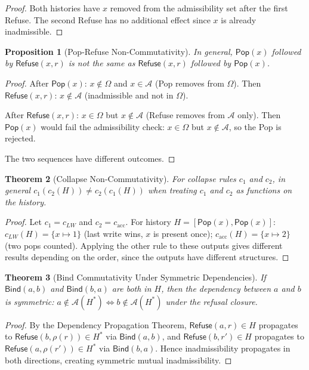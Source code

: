 \documentclass[12pt, a4paper, openany]{book}
\theoremstyle{plain}
\newtheorem{theorem}{Theorem}[chapter]
\newtheorem{proposition}[theorem]{Proposition}
\theoremstyle{definition}
\theoremstyle{remark}
\newcommand{\Pop}{\mathsf{Pop}}
\newcommand{\Refuse}{\mathsf{Refuse}}
\newcommand{\Bind}{\mathsf{Bind}}
\newcommand{\calA}{\mathcal{A}}
\begin{document}
\begin{proof}
Both histories have $x$ removed from the admissibility set after the first
Refuse. The second Refuse has no additional effect since $x$ is already
inadmissible.
\end{proof}

\begin{proposition}[Pop-Refuse Non-Commutativity]
In general, $\Pop(x)$ followed by $\Refuse(x, r)$ is not the same as
$\Refuse(x, r)$ followed by $\Pop(x)$.
\end{proposition}

\begin{proof}
After $\Pop(x)$: $x \notin \Omega$ and $x \in \calA$ (Pop removes from $\Omega$).
Then $\Refuse(x, r)$: $x \notin \calA$ (inadmissible and not in $\Omega$).

After $\Refuse(x, r)$: $x \in \Omega$ but $x \notin \calA$ (Refuse removes
from $\calA$ only). Then $\Pop(x)$ would fail the admissibility check: $x \in \Omega$
but $x \notin \calA$, so the Pop is rejected.

The two sequences have different outcomes.
\end{proof}

\begin{theorem}[Collapse Non-Commutativity]
For collapse rules $c_1$ and $c_2$, in general
$c_1(c_2(H)) \neq c_2(c_1(H))$ when treating $c_1$ and $c_2$ as functions
on the history.
\end{theorem}

\begin{proof}
Let $c_1 = c_{LW}$ and $c_2 = c_{\mathrm{acc}}$. For history $H = [\Pop(x), \Pop(x)]$:
$c_{LW}(H) = \{x \mapsto 1\}$ (last write wins, $x$ is present once);
$c_{\mathrm{acc}}(H) = \{x \mapsto 2\}$ (two pops counted).
Applying the other rule to these outputs gives different results depending on
the order, since the outputs have different structures.
\end{proof}

\begin{theorem}[Bind Commutativity Under Symmetric Dependencies]
If $\Bind(a, b)$ and $\Bind(b, a)$ are both in $H$, then the dependency between
$a$ and $b$ is symmetric: $a \notin \calA(H^*) \Leftrightarrow b \notin \calA(H^*)$
under the refusal closure.
\end{theorem}

\begin{proof}
By the Dependency Propagation Theorem, $\Refuse(a, r) \in H$ propagates to
$\Refuse(b, \rho(r)) \in H^*$ via $\Bind(a, b)$, and $\Refuse(b, r') \in H$
propagates to $\Refuse(a, \rho(r')) \in H^*$ via $\Bind(b, a)$.
Hence inadmissibility propagates in both directions, creating symmetric mutual
inadmissibility.
\end{proof}
\end{document}
